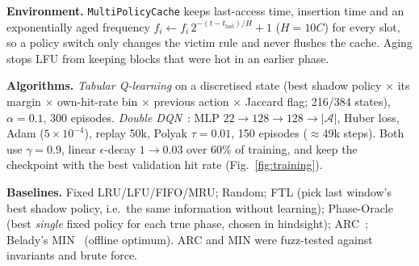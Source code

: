 \documentclass[twocolumn,10pt]{article}
\begin{document}
\textbf{Environment.} \texttt{MultiPolicyCache} keeps last-access time, insertion time and an
exponentially aged frequency $f_i\leftarrow f_i\,2^{-(t-t_{\text{last}})/H}{+}1$ ($H{=}10C$) for
every slot, so a policy switch only changes the victim rule and never flushes the cache. Aging stops
LFU from keeping blocks that were hot in an earlier phase.

\textbf{Algorithms.} \emph{Tabular Q-learning} on a discretised state
(best shadow policy $\times$ its margin $\times$ own-hit-rate bin $\times$ previous action $\times$
Jaccard flag; 216/384 states), $\alpha{=}0.1$, 300 episodes. \emph{Double DQN}~\cite{vanhasselt2016deep}:
MLP $22\!\to\!128\!\to\!128\!\to\!|\mathcal{A}|$, Huber loss, Adam ($5{\times}10^{-4}$), replay 50k,
Polyak $\tau{=}0.01$, 150 episodes ($\approx$49k steps). Both use $\gamma{=}0.9$, linear
$\epsilon$-decay $1\!\to\!0.03$ over 60\% of training, and keep the checkpoint with the best
validation hit rate (Fig.~\ref{fig:training}).

\textbf{Baselines.} Fixed LRU/LFU/FIFO/MRU; Random; FTL (pick last window's best shadow policy,
i.e.\ the same information without learning); Phase-Oracle (best \emph{single} fixed policy for each
true phase, chosen in hindsight); ARC~\cite{megiddo2003arc}; Belady's MIN~\cite{belady1966study}
(offline optimum). ARC and MIN were fuzz-tested against invariants and brute force.
\end{document}
